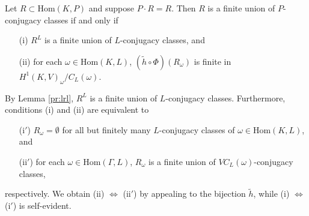 \begin{theorem}\label{r:finite_p} Let $R \subset \mathrm{Hom}(K, P)$ and suppose $P \cdot R = R$. Then $R$ is a finite union of $P$-conjugacy classes if and only if
	\begin{itemize}
		\item[(i)] $R^L$ is a finite union of $L$-conjugacy classes, and
		\item[(ii)] for each $\omega \in \mathrm{Hom}(K, L)$, $(\widetilde{h} \circ \Phi)(R_\omega)$ is finite in $H^1(K, V)_\omega/C_L(\omega)$.
	\end{itemize}
\end{theorem}
\begin{remark} By Lemma \ref{pr:lrl}, $R^L$ is a finite union of $L$-conjugacy classes. Furthermore, conditions (i) and (ii) are equivalent to 
	\begin{itemize}
		\item[(i$'$)] $R_\omega = \emptyset$ for all but finitely many $L$-conjugacy classes of $\omega \in \mathrm{Hom}(K, L)$, and
		\item[(ii$'$)] for each $\omega \in \mathrm{Hom}(\Gamma, L)$, $R_\omega$ is a finite union of $VC_L(\omega)$-conjugacy classes,
	\end{itemize}
	respectively. We obtain (ii) $\Leftrightarrow$ (ii$'$) by appealing to the bijection $\widetilde{h}$, while (i) $\Leftrightarrow$ (i$'$) is self-evident.
\end{remark}
